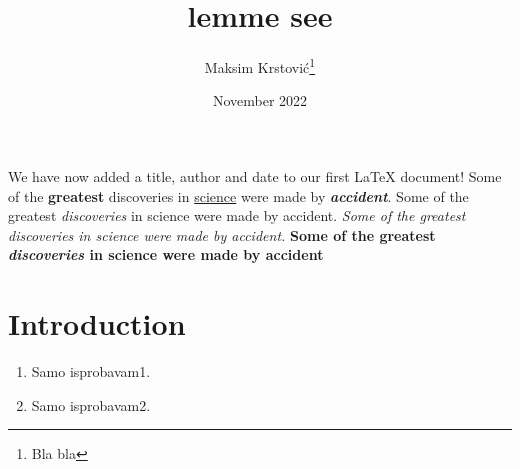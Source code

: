 \documentclass{article}
\title{lemme see}
\author{Maksim Krstović\thanks{Bla bla}}
\date{November 2022}
\begin{document}
\maketitle
We have now added a title, author and date to our first \LaTeX{} document!
Some of the \textbf{greatest} discoveries in \underline{science} were made by \textbf{\textit{accident}}. 
Some of the greatest \emph{discoveries} in science 
were made by accident.
\textit{Some of the greatest \emph{discoveries} 
in science were made by accident.}
\textbf{Some of the greatest \emph{discoveries} in science were made by accident}
\section{Introduction}


\begin{enumerate}
  \item Samo isprobavam1.
  \item Samo isprobavam2.
\end{enumerate}
\end{document}
